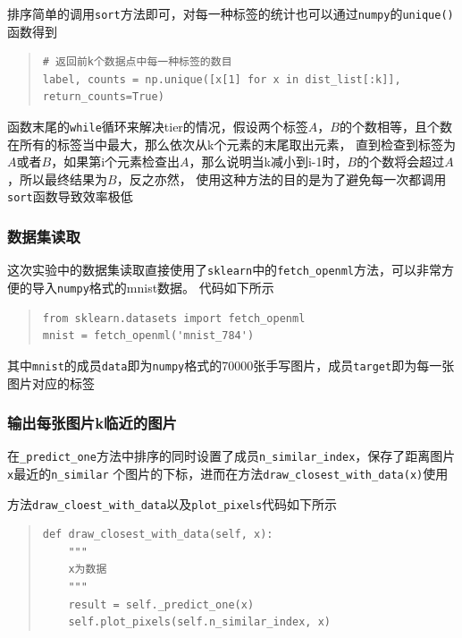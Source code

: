 \documentclass[UTF8]{ctexart}
\begin{document}
排序简单的调用\lstinline{sort}方法即可，对每一种标签的统计也可以通过\lstinline{numpy}的\lstinline{unique()}函数得到
\begin{quote}
    \begin{lstlisting}[breaklines, frame=tb, numbers=none]
# 返回前k个数据点中每一种标签的数目
label, counts = np.unique([x[1] for x in dist_list[:k]], return_counts=True)    
    \end{lstlisting}
\end{quote}

函数末尾的\lstinline{while}循环来解决tier的情况，假设两个标签$A$，$B$的个数相等，且个数在所有的标签当中最大，那么依次从k个元素的末尾取出元素，
直到检查到标签为$A$或者$B$，如果第i个元素检查出$A$，那么说明当k减小到i-1时，$B$的个数将会超过$A$，所以最终结果为$B$，反之亦然，
使用这种方法的目的是为了避免每一次都调用\lstinline{sort}函数导致效率极低

\subsubsection{数据集读取}
这次实验中的数据集读取直接使用了\lstinline{sklearn}中的\lstinline{fetch_openml}方法，可以非常方便的导入\lstinline{numpy}格式的mnist数据。
代码如下所示
\begin{quote}
    \begin{lstlisting}[breaklines]
from sklearn.datasets import fetch_openml
mnist = fetch_openml('mnist_784')
    \end{lstlisting}
\end{quote}
其中\lstinline{mnist}的成员\lstinline{data}即为\lstinline{numpy}格式的70000张手写图片，成员\lstinline{target}即为每一张图片对应的标签

\subsubsection{输出每张图片k临近的图片}
在\lstinline{_predict_one}方法中排序的同时设置了成员\lstinline{n_similar_index}，保存了距离图片\lstinline{x}最近的\lstinline{n_similar}
个图片的下标，进而在方法\lstinline{draw_closest_with_data(x)}使用

方法\lstinline{draw_cloest_with_data}以及\lstinline{plot_pixels}代码如下所示

\begin{quote}
    \begin{lstlisting}[breaklines, title=\lstinline{draw_closest_with_data}方法]
def draw_closest_with_data(self, x):
    """
    x为数据
    """
    result = self._predict_one(x)
    self.plot_pixels(self.n_similar_index, x)
    \end{lstlisting}
\end{quote}
\end{document}
